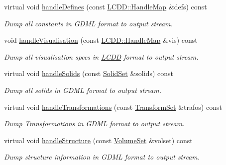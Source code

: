 \begin{DoxyCompactItemize}
virtual void \hyperlink{class_d_d4hep_1_1_geometry_1_1_geometry_tree_dump_ab51d5208b192c59e1863a047f7dac2c2}{handle\+Defines} (const \hyperlink{class_d_d4hep_1_1_geometry_1_1_l_c_d_d_a05cb11e7355772c7b0794bcca59bf477}{L\+C\+D\+D\+::\+Handle\+Map} \&defs) const
\begin{DoxyCompactList}\small\item\em Dump all constants in G\+D\+ML format to output stream. \end{DoxyCompactList}\item 
void \hyperlink{class_d_d4hep_1_1_geometry_1_1_geometry_tree_dump_a94102672b7b7c29426434fc1057c7334}{handle\+Visualisation} (const \hyperlink{class_d_d4hep_1_1_geometry_1_1_l_c_d_d_a05cb11e7355772c7b0794bcca59bf477}{L\+C\+D\+D\+::\+Handle\+Map} \&vis) const
\begin{DoxyCompactList}\small\item\em Dump all visualisation specs in \hyperlink{class_d_d4hep_1_1_geometry_1_1_l_c_d_d}{L\+C\+DD} format to output stream. \end{DoxyCompactList}\item 
virtual void \hyperlink{class_d_d4hep_1_1_geometry_1_1_geometry_tree_dump_a88e70e69ffe3e79eab56a8eeaec8a104}{handle\+Solids} (const \hyperlink{class_d_d4hep_1_1_geometry_1_1_geo_handler_types_a85d065cdf670a4f9ea9c0c4dee921fce}{Solid\+Set} \&solids) const
\begin{DoxyCompactList}\small\item\em Dump all solids in G\+D\+ML format to output stream. \end{DoxyCompactList}\item 
virtual void \hyperlink{class_d_d4hep_1_1_geometry_1_1_geometry_tree_dump_a09e0fc8cabe8ac49f95f534653b410b8}{handle\+Transformations} (const \hyperlink{class_d_d4hep_1_1_geometry_1_1_geo_handler_types_aa52b3113e87db04c37666e85a9b5e569}{Transform\+Set} \&trafos) const
\begin{DoxyCompactList}\small\item\em Dump Transformations in G\+D\+ML format to output stream. \end{DoxyCompactList}\item 
virtual void \hyperlink{class_d_d4hep_1_1_geometry_1_1_geometry_tree_dump_adc31b44fa58ad6aa613550fde32d4c6a}{handle\+Structure} (const \hyperlink{class_d_d4hep_1_1_geometry_1_1_geo_handler_types_a87ea3b22bdfe08f1a4afca3d58fd8ca0}{Volume\+Set} \&volset) const
\begin{DoxyCompactList}\small\item\em Dump structure information in G\+D\+ML format to output stream. \end{DoxyCompactList}\end{DoxyCompactItemize}
